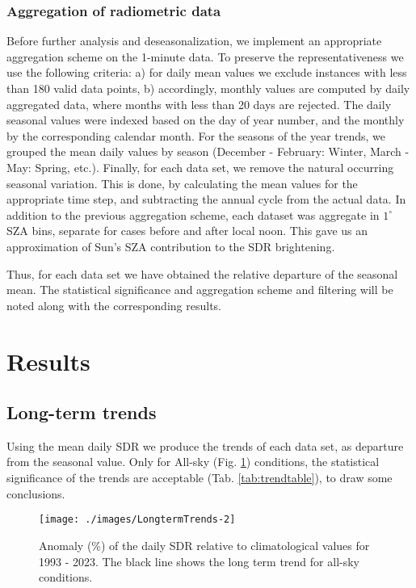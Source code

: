 \documentclass[
  preprint, 3p, authoryear]{article}
\begin{document}
\hypertarget{aggregation-of-radiometric-data}{%
\subsubsection{Aggregation of radiometric data}\label{aggregation-of-radiometric-data}}

Before further analysis and deseasonalization, we implement an appropriate aggregation scheme on the 1-minute data. To preserve the representativeness we use the following criteria:
a) for daily mean values we exclude instances with less than 180 valid data points,
b) accordingly, monthly values are computed by daily aggregated data, where months with less than 20 days are rejected.
The daily seasonal values were indexed based on the day of year number, and the monthly by the corresponding calendar month.
For the seasons of the year trends, we grouped the mean daily values by season (December - February: Winter, March - May: Spring, etc.).
Finally, for each data set, we remove the natural occurring seasonal variation.
This is done, by calculating the mean values for the appropriate time step, and subtracting the annual cycle from the actual data.
In addition to the previous aggregation scheme, each dataset was aggregate in \(1^\circ\) SZA bins, separate for cases before and after local noon.
This gave us an approximation of Sun's SZA contribution to the SDR brightening.

Thus, for each data set we have obtained the relative departure of the seasonal mean.
The statistical significance and aggregation scheme and filtering will be noted along with the corresponding results.

\hypertarget{results}{%
\section{Results}\label{results}}

\hypertarget{long-term-trends}{%
\subsection{Long-term trends}\label{long-term-trends}}

Using the mean daily SDR we produce the trends of each data set, as departure from the seasonal value.
Only for All-sky (Fig. \ref{fig:trendALL}) conditions, the statistical significance of the trends are acceptable (Tab. \ref{tab:trendtable}), to draw some conclusions.

\begin{figure}[h!]

{\centering \texttt{[image: ./images/LongtermTrends-2]} 

}

\caption{Anomaly (\%) of the daily SDR relative to climatological values for 1993 - 2023. The black line shows the long term trend for all-sky conditions.}\label{fig:trendALL}
\end{figure}
\end{document}
